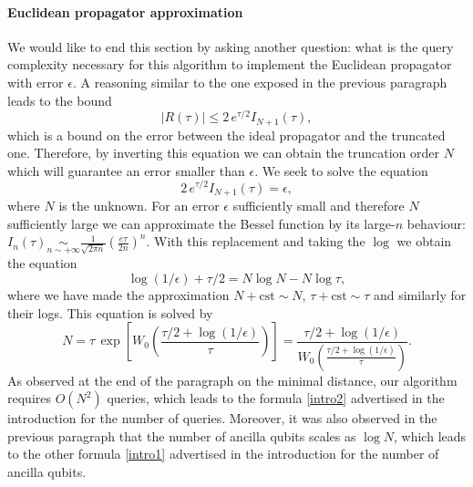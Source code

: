 \documentclass[a4paper,11pt]{article}
\begin{document}
\paragraph{Euclidean propagator approximation} We would like to end this section by asking another question: what is the query complexity necessary for this algorithm to implement the Euclidean propagator with error $\epsilon$. A reasoning similar to the one exposed in the previous paragraph leads to the bound
\begin{equation}
    |R(\tau)|\leq 2\,e^{\tau/2}I_{N+1}(\tau),
\end{equation}
which is a bound on the error between the ideal propagator and the truncated one. Therefore, by inverting this equation we can obtain the truncation order $N$ which will guarantee an error smaller than $\epsilon$. We seek to solve the equation 
\begin{equation}
2\,e^{\tau/2}I_{N+1}(\tau) = \epsilon,
\end{equation}
where $N$ is the unknown. For an error $\epsilon$ sufficiently small and therefore $N$ sufficiently large we can approximate the Bessel function by its large-$n$ behaviour: $I_n(\tau)\underset{n\sim +\infty}{\sim}\frac{1}{\sqrt{2\pi n}}\left(\frac{e\tau}{2n}\right)^n$. With this replacement and taking the $\log$ we obtain the equation 
\begin{equation}
    \log(1/\epsilon)+\tau/2 = N\log N - N\log\tau,
\end{equation}
where we have made the approximation $N+\mathrm{cst}\sim N$, $\tau+\mathrm{cst}\sim \tau$ and similarly for their logs. This equation is solved by 
\begin{equation}
    N = \tau\, \exp \left[W_0\left(\frac{\tau/2+\log(1/\epsilon)}{\tau}\right)\right]=\frac{\tau/2+\log(1/\epsilon)}{W_0\left(\frac{\tau/2+\log(1/\epsilon)}{\tau}\right)}.
    \label{ScalingTruncation}
\end{equation}
As observed at the end of the paragraph on the minimal distance, our algorithm requires $O\left(N^2\right)$ queries, which leads to the formula \eqref{intro2} advertised in the introduction for the number of queries. Moreover, it was also observed in the previous paragraph that the number of ancilla qubits scales as $\log N$, which leads to the other formula \eqref{intro1} advertised in the introduction for the number of ancilla qubits.
\end{document}
